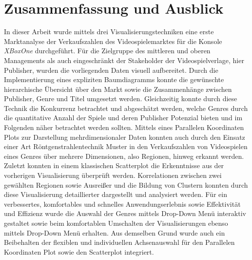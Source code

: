 \documentclass[usegeometry=true]{scrartcl}
\begin{document}
\section{Zusammenfassung und Ausblick}
In dieser Arbeit wurde mittels drei Visualisierungstechniken eine erste Marktanalyse der Verkaufszahlen des Videospielemarktes für die Konsole \textit{XBoxOne} durchgeführt. 
Für die Zielgruppe des mittleren und oberen Managements als auch eingeschränkt der Stakeholder der Videospielverlage, hier Publisher, wurden die vorliegenden Daten visuell aufbereitet. 
Durch die Implementierung eines expliziten Baumdiagramms konnte die gewünschte hierarchische Übersicht über den Markt sowie die Zusammenhänge zwischen Publisher, Genre und Titel umgesetzt werden.
Gleichzeitig konnte durch diese Technik die Konkurrenz betrachtet und abgeschätzt werden, welche Genres durch die quantitative Anzahl der Spiele und deren Publisher Potenzial bieten und im Folgenden näher betrachtet werden sollten.
Mittels eines Parallelen Koordinaten Plots zur Darstellung mehrdimensionaler Daten konnten auch durch den Einsatz einer Art Röntgenstrahlentechnik Muster in den Verkaufszahlen von Videospielen eines Genres über mehrere Dimensionen, also Regionen, hinweg erkannt werden.
Zuletzt konnten in einem klassischen Scatterplot die Erkenntnisse aus der vorherigen Visualisierung überprüft werden. 
Korrelationen zwischen zwei gewählten Regionen sowie Ausreißer und die Bildung von Clustern konnten durch diese Visualisierung detaillierter dargestellt und analysiert werden.
Für ein verbessertes, komfortables und schnelles Anwendungserlebnis sowie Effektivität und Effizienz wurde die Auswahl der Genres mittels Drop-Down Menü interaktiv gestaltet sowie beim komfortablen Umschalten der Visualisierungen ebenso mittels Drop-Down Menü erhalten.
Aus demselben Grund wurde auch ein Beibehalten der flexiblen und individuellen Achsenauswahl für den Parallelen Koordinaten Plot sowie den Scatterplot integriert.
\end{document}
